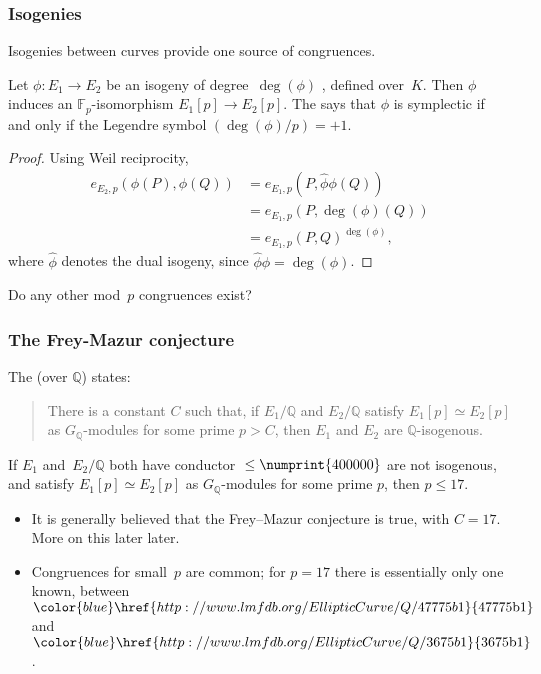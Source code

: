\documentclass[handout]{beamer}
\newcommand{\Q}{\mathbb Q}
\newcommand{\F}{\mathbb F}
\newcommand{\lmfdbec}[3]{\color{blue}\href{http://www.lmfdb.org/EllipticCurve/Q/#1#2#3}{{\text{\rm#1#2#3}}}}
\newcommand{\high}[1]{\emph{\color{blue}{#1}}}
\begin{document}
\begin{frame}\frametitle{Isogenies}
  Isogenies between curves provide one source of congruences.
  \pause\medskip

  Let $\phi:E_1\to E_2$ be an isogeny of degree~$\deg(\phi)$
  \high{coprime to $p$}, defined over~$K$.  Then $\phi$ induces an
  $\F_p$-isomorphism $E_1[p]\to E_2[p]$.  The \high{isogeny criterion}
  says that $\phi$ is symplectic if and only if the Legendre symbol
  $({\deg(\phi)}/{p})=+1$.
  \pause\medskip

  \begin{proof}
    Using Weil reciprocity,
    \[
    \begin{aligned}
      e_{E_2,p}(\phi(P), \phi(Q)) &= e_{E_1,p}(P, \hat\phi\phi(Q)) \\
      &= e_{E_1,p}(P, \deg(\phi)(Q))\\ &= e_{E_1,p}(P,
      Q)^{\deg(\phi)},
    \end{aligned}
  \]
  where $\hat{\phi}$ denotes the dual isogeny, since $\hat\phi\phi=\deg(\phi)$.
  \end{proof}
  \pause\medskip

  Do any other mod~$p$ congruences exist?
\end{frame}

\begin{frame}\frametitle{The Frey-Mazur conjecture}
  The \high{Frey--Mazur conjecture} (over $\Q$) states:

  \begin{quote}There is a constant $C$ such that, if $E_1/\Q$ and $E_2/\Q$
  satisfy $E_1[p] \simeq E_2[p]$ as $G_\Q$-modules for some prime $p >
  C$, then $E_1$ and $E_2$ are $\Q$-isogenous.
  \end{quote}

  \pause\medskip

  \begin{theorem}[C. \& Freitas]
  If $E_1$ and~$E_2/\Q$ both have conductor ${}\le\numprint{400000}$
  are not isogenous, and satisfy $E_1[p] \simeq E_2[p]$ as
  $G_\Q$-modules for some prime $p$, then $p\le17$.
  \end{theorem}

  \pause\medskip
  \begin{itemize}
    \item It is generally believed that the Frey--Mazur
      conjecture is true, with $C=17$. More on this later later.
      \item Congruences for small~$p$ are common; for $p=17$ there is
        essentially only one known, between $\lmfdbec{47775}{b}{1}$
        and~$\lmfdbec{3675}{b}{1}$.
  \end{itemize}

\end{frame}
\end{document}
